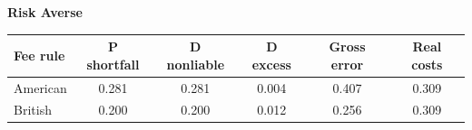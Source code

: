 \documentclass[10pt,border=5pt,varwidth=17cm]{standalone}
\begin{document}
\begingroup
\small
\setlength{\tabcolsep}{5pt}
\renewcommand{\arraystretch}{1.20}
\noindent\textbf{Risk Averse}\par\smallskip
\noindent\begin{tabularx}{\linewidth}{@{}>{\raggedright\arraybackslash}Xccccc@{}}
\toprule
\textbf{Fee rule} & \textbf{P shortfall} & \textbf{D nonliable} & \textbf{D excess} & \textbf{Gross error} & \textbf{Real costs} \\
\midrule
American & 0.281 & 0.281 & 0.004 & 0.407 & 0.309 \\
British & 0.200 & 0.200 & 0.012 & 0.256 & 0.309 \\
\bottomrule\end{tabularx}\par\medskip
\endgroup
\end{document}
